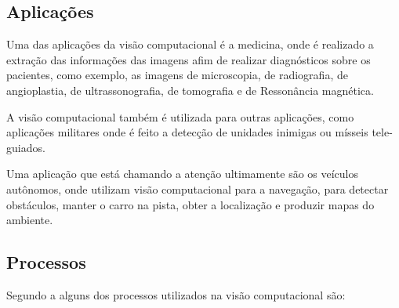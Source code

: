 \documentclass{article}
\begin{document}
    \subsection{Aplicações}

    Uma das aplicações da visão computacional é a medicina, onde é realizado a extração das informações das imagens afim de realizar diagnósticos sobre os pacientes, como exemplo, as imagens de microscopia, de radiografia, de angioplastia, de ultrassonografia, de tomografia e de Ressonância magnética.
    
    A visão computacional também é utilizada para outras aplicações, como aplicações militares onde é feito a detecção de unidades inimigas ou mísseis tele-guiados.
    
    Uma aplicação que está chamando a atenção ultimamente são os veículos autônomos, onde utilizam visão computacional para a navegação, para detectar obstáculos, manter o carro na pista, obter a localização e produzir mapas do ambiente.

    \subsection{Processos}
    
    Segundo a  alguns dos processos utilizados na visão computacional são:
    
\end{document}
